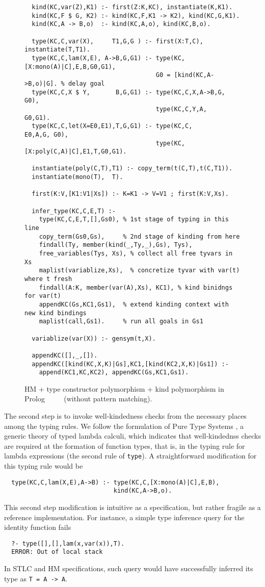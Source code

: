 \documentclass[runningheads,a4paper]{llncs}
\begin{document}
\begin{figure}
\begin{verbatim}
  kind(KC,var(Z),K1) :- first(Z:K,KC), instantiate(K,K1).
  kind(KC,F $ G, K2) :- kind(KC,F,K1 -> K2), kind(KC,G,K1).
  kind(KC,A -> B,o)  :- kind(KC,A,o), kind(KC,B,o).
  
  type(KC,C,var(X),     T1,G,G ) :- first(X:T,C), instantiate(T,T1).
  type(KC,C,lam(X,E), A->B,G,G1) :- type(KC,[X:mono(A)|C],E,B,G0,G1),
                                    G0 = [kind(KC,A->B,o)|G]. % delay goal
  type(KC,C,X $ Y,       B,G,G1) :- type(KC,C,X,A->B,G, G0),
                                    type(KC,C,Y,A,   G0,G1).
  type(KC,C,let(X=E0,E1),T,G,G1) :- type(KC,C,              E0,A,G, G0),
                                    type(KC,[X:poly(C,A)|C],E1,T,G0,G1).
  
  instantiate(poly(C,T),T1) :- copy_term(t(C,T),t(C,T1)).
  instantiate(mono(T),  T).
  
  first(K:V,[K1:V1|Xs]) :- K=K1 -> V=V1 ; first(K:V,Xs).
  
  infer_type(KC,C,E,T) :-
    type(KC,C,E,T,[],Gs0), % 1st stage of typing in this line
    copy_term(Gs0,Gs),     % 2nd stage of kinding from here
    findall(Ty, member(kind(_,Ty,_),Gs), Tys),
    free_variables(Tys, Xs), % collect all free tyvars in Xs
    maplist(variablize,Xs),  % concretize tyvar with var(t) where t fresh
    findall(A:K, member(var(A),Xs), KC1), % kind binidngs for var(t)
    appendKC(Gs,KC1,Gs1),  % extend kinding context with new kind bindings
    maplist(call,Gs1).     % run all goals in Gs1
  
  variablize(var(X)) :- gensym(t,X).

  appendKC([],_,[]).
  appendKC([kind(KC,X,K)|Gs],KC1,[kind(KC2,X,K)|Gs1]) :-
    append(KC1,KC,KC2), appendKC(Gs,KC1,Gs1).
\end{verbatim}
\caption{HM + type constructor polymorphism + kind polymorphism in Prolog
        $\qquad$
        (without pattern matching).}
\label{fig:HMtck}
\end{figure}

The second step is to invoke well-kindedness checks from the necessary
places among the typing rules. We follow the formulation of Pure Type
Systems \cite{Barendregt91}, a generic theory of typed lambda calculi,
which indicates that well-kindednss checks are required at the
formation of function types, that is, in the typing rule for lambda
expressions (the second rule of \verb|type|).
A straightforward modification for this typing rule would be
\begin{verbatim}
  type(KC,C,lam(X,E),A->B) :- type(KC,C,[X:mono(A)|C],E,B),
                              kind(KC,A->B,o).
\end{verbatim}
This second step modification is intuitive as a specification, but
rather fragile as a reference implementation. For instance,
a simple type inference query for the identity function fails
\begin{verbatim}
  ?- type([],[],lam(x,var(x)),T).
  ERROR: Out of local stack
\end{verbatim}
In STLC and HM specifications, such query would have successfully
inferred its type as \verb|T = A -> A|.
\end{document}
